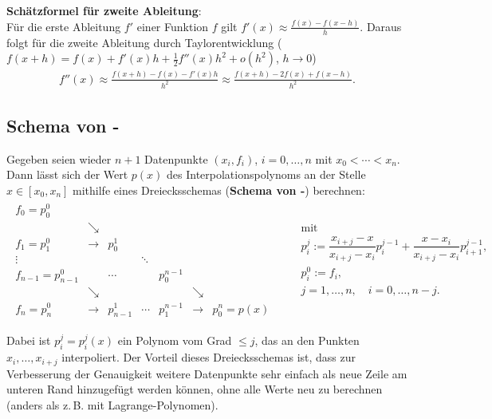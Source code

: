 \linie

\textbf{Schätzformel für zweite Ableitung}: \\
Für die erste Ableitung $f'$ einer Funktion $f$ gilt
$f'(x) \approx \frac{f(x) - f(x - h)}{h}$.
Daraus folgt für die zweite Ableitung durch Taylorentwicklung
($f(x + h) = f(x) + f'(x)h + \frac{1}{2} f''(x) h^2 + o(h^2)$, $h \to 0$)
\begin{align*}
    f''(x) \approx \frac{f(x + h) - f(x) - f'(x)h}{h^2}
    \approx \frac{f(x + h) - 2f(x) + f(x - h)}{h^2}.
\end{align*}

\subsection{%
    Schema von -%
}

Gegeben seien wieder $n + 1$ Datenpunkte $(x_i, f_i)$, $i = 0, \dotsc, n$
mit $x_0 < \dotsb < x_n$. \\
Dann lässt sich der Wert $p(x)$ des Interpolationspolynoms an der Stelle
$x \in [x_0, x_n]$ mithilfe eines Dreiecksschemas
(\textbf{Schema von -}) berechnen:
\begin{align*}
    \begin{array}{ccccccc}
        f_0 = p_0^0 \\
        & \searrow \\
        f_1 = p_1^0 & \rightarrow & p_0^1 \\
        \vdots & & & \ddots \\
        f_{n-1} = p_{n-1}^0 & & \cdots & & p_0^{n-1} \\
        & \searrow & & & & \searrow \\
        f_n = p_n^0 & \rightarrow & p_{n-1}^1 & \cdots & p_1^{n-1} &
        \rightarrow & p_0^n = p(x)
    \end{array}\qquad
    \begin{array}{l}
        \text{mit} \\
        p_i^j := \dfrac{x_{i+j} - x}{x_{i+j} - x_i} p_i^{j-1} +
        \dfrac{x - x_i}{x_{i+j} - x_i} p_{i+1}^{j-1}, \\
        p_i^0 := f_i, \\[3mm]
        j = 1, \dotsc, n,\quad i = 0, \dotsc, n - j.
    \end{array}
\end{align*}

Dabei ist $p_i^j = p_i^j(x)$ ein Polynom vom Grad $\le j$, das an den Punkten
$x_i, \dotsc, x_{i+j}$ interpoliert.
Der Vorteil dieses Dreiecksschemas ist, dass zur Verbesserung der Genauigkeit
weitere Datenpunkte sehr einfach als neue Zeile am unteren Rand hinzugefügt
werden können, ohne alle Werte neu zu berechnen
(anders als z.\,B. mit Lagrange-Polynomen).

